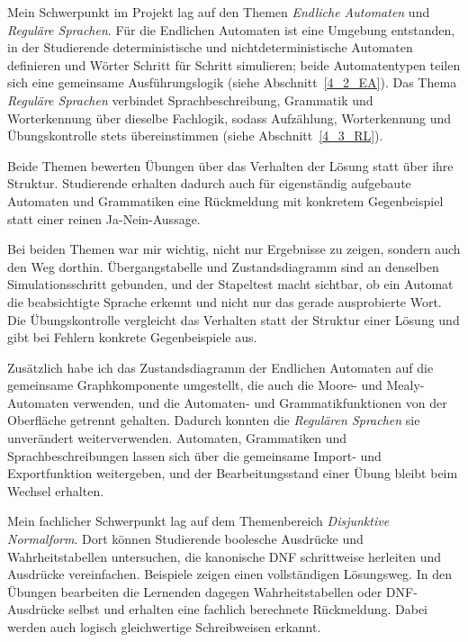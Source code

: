 Mein Schwerpunkt im Projekt lag auf den Themen
\emph{Endliche Automaten} und \emph{Reguläre Sprachen}.
Für die Endlichen Automaten ist eine Umgebung entstanden, in der Studierende
deterministische und nichtdeterministische Automaten definieren und Wörter Schritt
für Schritt simulieren; beide Automatentypen teilen sich eine gemeinsame
Ausführungslogik (siehe Abschnitt~\ref{4_2_EA}).
Das Thema \emph{Reguläre Sprachen} verbindet Sprachbeschreibung, Grammatik und
Worterkennung über dieselbe Fachlogik, sodass Aufzählung, Worterkennung und
Übungskontrolle stets übereinstimmen (siehe Abschnitt~\ref{4_3_RL}).

Beide Themen bewerten Übungen über das Verhalten der Lösung statt über ihre
Struktur.
Studierende erhalten dadurch auch für eigenständig aufgebaute Automaten und
Grammatiken eine Rückmeldung mit konkretem Gegenbeispiel statt einer reinen
Ja-Nein-Aussage.

Bei beiden Themen war mir wichtig, nicht nur Ergebnisse zu zeigen, sondern auch
den Weg dorthin. Übergangstabelle und Zustandsdiagramm sind an denselben
Simulationsschritt gebunden, und der Stapeltest macht sichtbar, ob ein Automat die
beabsichtigte Sprache erkennt und nicht nur das gerade ausprobierte Wort. Die
Übungskontrolle vergleicht das Verhalten statt der Struktur einer Lösung und gibt
bei Fehlern konkrete Gegenbeispiele aus.

Zusätzlich habe ich das Zustandsdiagramm der Endlichen Automaten auf die
gemeinsame Graphkomponente umgestellt, die auch die Moore- und Mealy-Automaten
verwenden, und die Automaten- und Grammatikfunktionen von der Oberfläche getrennt
gehalten. Dadurch konnten die \emph{Regulären Sprachen} sie unverändert
weiterverwenden. Automaten, Grammatiken und Sprachbeschreibungen lassen sich über
die gemeinsame Import- und Exportfunktion weitergeben, und der Bearbeitungsstand
einer Übung bleibt beim Wechsel erhalten.

Mein fachlicher Schwerpunkt lag auf dem Themenbereich
\emph{Disjunktive Normalform}. Dort können Studierende boolesche Ausdrücke und
Wahrheitstabellen untersuchen, die kanonische DNF schrittweise herleiten und Ausdrücke
vereinfachen. Beispiele zeigen einen vollständigen Lösungsweg. In den Übungen bearbeiten
die Lernenden dagegen Wahrheitstabellen oder DNF-Ausdrücke selbst und erhalten eine
fachlich berechnete Rückmeldung. Dabei werden auch logisch gleichwertige Schreibweisen
erkannt.

